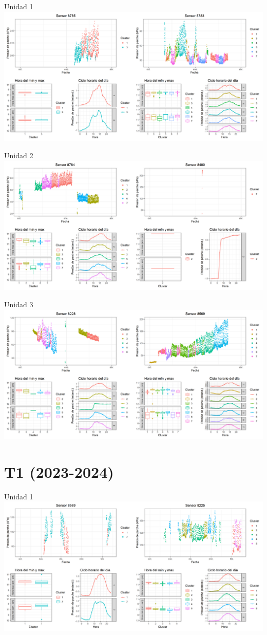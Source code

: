 \documentclass[
  letterpaper,
  DIV=11,
  numbers=noendperiod]{scrreprt}
\begin{document}
Unidad 1
\includegraphics{figuras/02_turgor_limpiado/2022_2023_La_Esperanza_T4_Unidad_1.png}

Unidad 2
\includegraphics{figuras/02_turgor_limpiado/2022_2023_La_Esperanza_T4_Unidad_2.png}

Unidad 3
\includegraphics{figuras/02_turgor_limpiado/2022_2023_La_Esperanza_T4_Unidad_3.png}

\chapter{T1 (2023-2024)}

Unidad 1
\includegraphics{figuras/02_turgor_limpiado/2023_2024_La_Esperanza_T1_Unidad_1.png}
\end{document}
